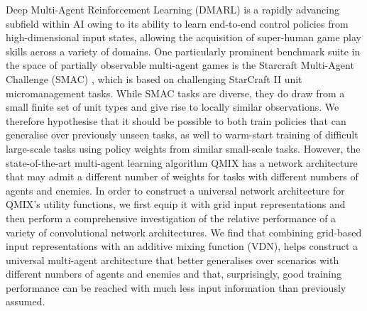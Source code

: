 Deep Multi-Agent Reinforcement Learning (DMARL) is a rapidly advancing subfield within AI owing to its ability to learn end-to-end control policies from high-dimensional input states, allowing the acquisition of super-human game play skills across a variety of domains. One particularly prominent benchmark suite in the space of partially observable multi-agent games is the Starcraft Multi-Agent Challenge (SMAC) \cite{smac}, which is based on challenging StarCraft II unit micromanagement tasks. 
While SMAC tasks are diverse, they do draw from a small finite set of unit types and give rise to locally similar observations. We therefore hypothesise that it should be possible to both train policies that can generalise over previously unseen tasks, as well to warm-start training of difficult large-scale tasks using policy weights from similar small-scale tasks.
However, the state-of-the-art multi-agent learning algorithm QMIX \cite{qmixcite} has a network architecture that may admit a different number of weights for tasks with different numbers of agents and enemies.  
In order to construct a universal network architecture for QMIX's utility functions, we first equip it with grid input representations and then perform a comprehensive investigation of the relative performance of a variety of convolutional network architectures. We find that combining grid-based input representations with an additive mixing function (VDN), helps construct a universal multi-agent architecture that better generalises over scenarios with different numbers of agents and enemies and that, surprisingly, good training performance can be reached with much less input information than previously assumed.